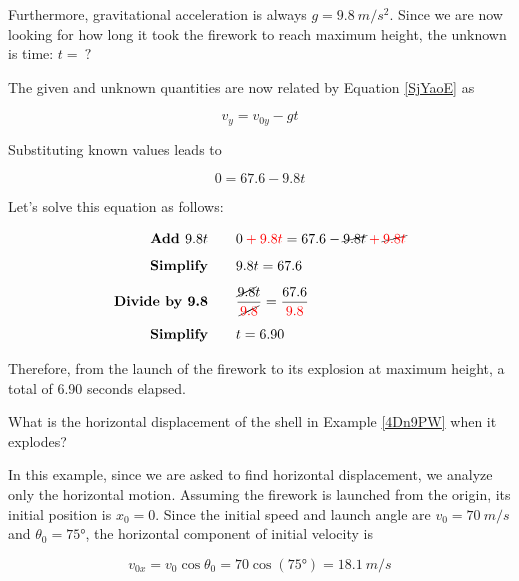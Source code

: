 \documentclass[main.tex]{subfiles}
\begin{document}
Furthermore, gravitational acceleration is always $g = \SI{9.8}{m/s^2}$. Since we are now looking for how long it took the firework to reach maximum height, the unknown is time: $t =\ ?$

\vspace{1em}

The given and unknown quantities are now related by Equation \eqref{SjYaoE} as 

\begin{equation*}
    v_y = v_{0y} - gt
\end{equation*}

Substituting known values leads to

\begin{equation*}
    0 = 67.6 - 9.8 t
\end{equation*}

Let's solve this equation as follows:

\begin{align*}
    \textbf{Add $9.8 t$} \qquad & 0 \mathbin{\color{red} +} \textcolor{red}{9.8 t} = 67.6 - \cancel{9.8 t} \mathbin{\color{red} +} \cancel{\textcolor{red}{9.8 t}}\\[1ex]
    \textbf{Simplify} \qquad & 9.8 t = 67.6\\[1ex]
    \textbf{Divide by 9.8} \qquad & \frac{\cancel{9.8} t}{\cancel{\textcolor{red}{9.8}}} = \frac{67.6}{\textcolor{red}{9.8}}\\[1ex]
    \textbf{Simplify} \qquad & t = 6.90
\end{align*}

Therefore, from the launch of the firework to its explosion at maximum height, a total of 6.90 seconds elapsed.

\endsolution

\begin{example} 
    What is the horizontal displacement of the shell in Example \ref{4Dn9PW} when it explodes?
\end{example}

\Solution In this example, since we are asked to find horizontal displacement, we analyze only the horizontal motion. Assuming the firework is launched from the origin, its initial position is $x_0 = 0$. Since the initial speed and launch angle are $v_0 = \SI{70}{m/s}$ and $\theta_0 = \ang{75}$,  the horizontal component of initial velocity is

\begin{equation*}
    v_{0x} = v_0 \cos{\theta_0} = 70 \cos{(\ang{75})} = \SI{18.1}{m/s}
\end{equation*}
\end{document}
